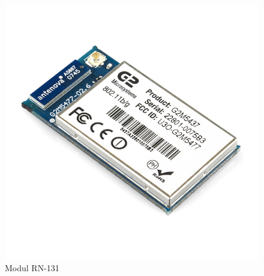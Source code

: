 \documentclass[times, utf8, zavrsni]{fer}
\begin{document}
\begin{figure}[H]
    \centering
    \includegraphics[scale=1]{rn131.jpg}
    \caption{Modul RN-131}
\end{figure}

\end{document}
